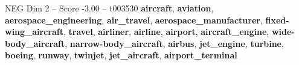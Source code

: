 \begin{textsample}{NEG Dim 2 – Score -3.00 – t003530}  \label{ex:f2_neg_020}
\textbf{aircraft}, \textbf{aviation}, \textbf{aerospace\_engineering}, \textbf{air\_travel}, \textbf{aerospace\_manufacturer}, \textbf{fixed-wing\_aircraft}, \textbf{travel}, \textbf{airliner}, \textbf{airline}, \textbf{airport}, \textbf{aircraft\_engine}, \textbf{wide-body\_aircraft}, \textbf{narrow-body\_aircraft}, \textbf{airbus}, \textbf{jet\_engine}, \textbf{turbine}, \textbf{boeing}, \textbf{runway}, \textbf{twinjet}, \textbf{jet\_aircraft}, \textbf{airport\_terminal}

\end{textsample}
